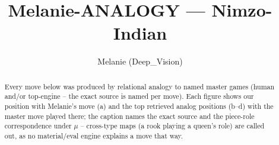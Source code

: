 \documentclass[11pt]{article}
\title{Melanie-ANALOGY — Nimzo-Indian}
\author{Melanie (Deep\_Vision)}
\date{}
\begin{document}
\maketitle

\begin{abstract}Every move below was produced by relational analogy to named master games (human and/or top-engine -- the exact source is named per move). Each figure shows our position with Melanie's move (a) and the top retrieved analog positions (b--d) with the master move played there; the caption names the exact source and the piece-role correspondence under $\mu$ -- cross-type maps (a rook playing a queen's role) are called out, as no material/eval engine explains a move that way.\end{abstract}

\begin{figure}[p]\centering
\begin{subfigure}{0.46\textwidth}\centering
\resizebox{\linewidth}{!}{%
\newchessgame
\chessboard[
  setfen={rnbq1rk1/pp3ppp/4pn2/2pp4/1bPP3P/2NBPN2/PP3PP1/R1BQK2R b KQ - 0 7},
  showmover=false,
  pgfstyle=straightmove, color=movearrow, markmove={b7-b6}
]}
\caption{}
\end{subfigure}\hfill
\begin{subfigure}{0.46\textwidth}\centering
\resizebox{\linewidth}{!}{%
\newchessgame
\chessboard[
  setfen={rnbq1rk1/ppp2ppp/4pn2/3p4/1bPP4/2NBPN2/PP3PPP/R1BQK2R b KQ - 1 6},
  showmover=false,
  pgfstyle=straightmove, color=movearrow, markmove={c7-c5}
]}
\caption{}
\end{subfigure}
\\[4pt]
\begin{subfigure}{0.46\textwidth}\centering
\resizebox{\linewidth}{!}{%
\newchessgame
\chessboard[
  setfen={rnbq1rk1/ppp2ppp/4pn2/3p4/1bPP4/2NBPN2/PP3PPP/R1BQK2R b KQ - 1 6},
  showmover=false,
  pgfstyle=straightmove, color=movearrow, markmove={c7-c5}
]}
\caption{}
\end{subfigure}\hfill
\begin{subfigure}{0.46\textwidth}\centering
\resizebox{\linewidth}{!}{%
\newchessgame
\chessboard[
  setfen={rnbq1rk1/ppp2ppp/4pn2/3p4/1bPP4/2NBPN2/PP3PPP/R1BQK2R b KQ - 1 6},
  showmover=false,
  pgfstyle=straightmove, color=movearrow, markmove={c7-c5}
]}
\caption{}
\end{subfigure}

\end{figure}
\end{document}
